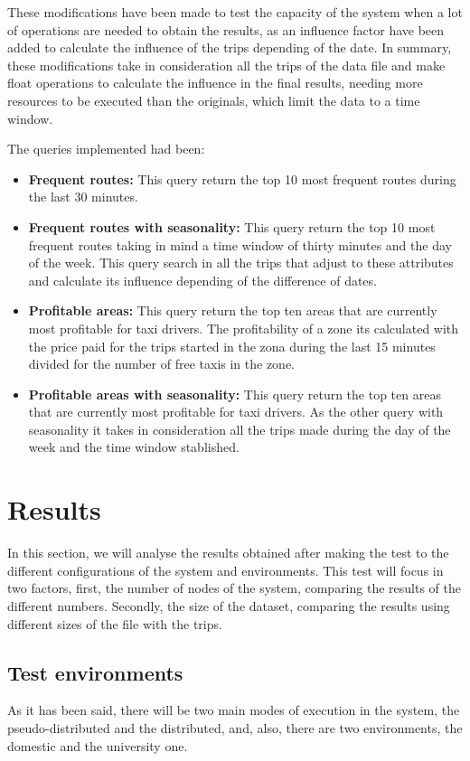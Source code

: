 These modifications have been made to test the capacity of the system when a lot of operations are needed to obtain the results, as an influence factor have been added to calculate the influence of the trips depending of the date. In summary, these modifications take in consideration all the trips of the data file and make float operations to calculate the influence in the final results, needing more resources to be executed than the originals, which limit the data to a time window.

The queries implemented had been:

\begin{itemize}
\item \textbf{Frequent routes:} This query return the top 10 most frequent routes during the last 30 minutes. 
\item \textbf{Frequent routes with seasonality:} This query return the top 10 most frequent routes taking in mind a time window of thirty minutes and the day of the week. This query search in all the trips that adjust to these attributes and calculate its influence depending of the difference of dates.
\item \textbf{Profitable areas:} This query return the top ten areas that are currently most profitable for taxi drivers. The profitability of a zone its calculated with the price paid for the trips started in the zona during the last 15 minutes divided for the number of free taxis in the zone.
\item \textbf{Profitable areas with seasonality:} This query return the top ten areas that are currently most profitable for taxi drivers. As the other query with seasonality it takes in consideration all the trips made during the day of the week and the time window stablished.
\end{itemize}

\section{Results}
In this section, we will analyse the results obtained after making the test to the different configurations of the system and environments. This test will focus in two factors, first, the number of nodes of the system, comparing the results of the different numbers. Secondly, the size of the dataset, comparing the results using different sizes of the file with the trips.

\subsection{Test environments}
As it has been said, there will be two main modes of execution in the system, the pseudo-distributed and the distributed, and, also, there are two environments, the domestic and the university one.


